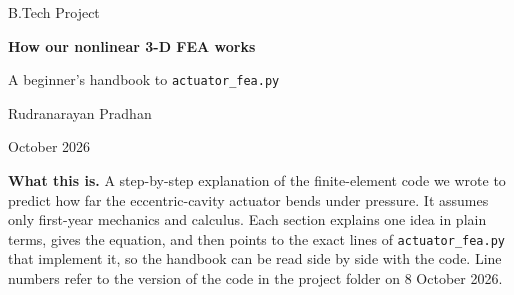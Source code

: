 \documentclass[11pt,a4paper]{article}
\numberwithin{equation}{section}
\newcommand{\uu}{\mathbf{u}}
\newcommand{\K}{\mathbf{K}}
\newcommand{\R}{\mathbf{R}}
\begin{document}
\begin{titlepage}
\centering
\vspace*{2.4cm}
{\large B.Tech Project\par}
\vspace{0.6cm}
{\LARGE\bfseries How our nonlinear 3-D FEA works\par}
\vspace{0.4cm}
{\Large A beginner's handbook to \texttt{actuator\_fea.py}\par}
\vspace{1.4cm}


\vspace{1.4cm}
{\large Rudranarayan Pradhan\par}
\vspace{0.3cm}
{\normalsize October 2026\par}
\vfill
\begin{minipage}{0.86\textwidth}
\small\textbf{What this is.}
A step-by-step explanation of the finite-element code we wrote to predict how far
the eccentric-cavity actuator bends under pressure. It assumes only first-year
mechanics and calculus. Each section explains one idea in plain terms, gives the
equation, and then points to the exact lines of \texttt{actuator\_fea.py} that
implement it, so the handbook can be read side by side with the code. Line numbers
refer to the version of the code in the project folder on 8 October 2026.
\end{minipage}
\vspace{0.6cm}
\end{titlepage}
\end{document}

